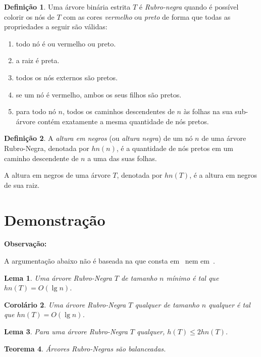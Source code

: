 \documentclass[11pt,twoside]{article}
\newtheorem{theorem}{Teorema}[section]
\newtheorem{lemma}[theorem]{Lema}
\newtheorem{corollary}[theorem]{Corolário}
\theoremstyle{definition}
\newtheorem{definition}{Definição}[section]
\begin{document}
\begin{definition}
	Uma árvore binária estrita \( T \) é \emph{Rubro-negra} quando é possível colorir os nós de \( T \) com as cores \emph{vermelho} ou \emph{preto} de forma que todas as propriedades a seguir são válidas:
	\begin{enumerate}[label=(\alph*)]
		\item todo nó é ou vermelho ou preto.
		\item a raiz é preta.
		\item todos os nós externos são pretos.
		\item se um nó é vermelho, ambos os seus filhos são pretos.
		\item para todo nó \( n \), todos os caminhos descendentes de \( n \) às folhas na sua sub-árvore contém exatamente a mesma quantidade de nós pretos.
	\end{enumerate}
\end{definition}

\begin{definition}
	A \emph{altura em negros} (ou \emph{altura negra}) de um nó \( n \) de uma árvore Rubro-Negra, denotada por \( hn(n) \), é a quantidade de nós pretos em um caminho descendente de \( n \) a uma das suas folhas.

	A altura em negros de uma árvore \( T \), denotada por \( hn(T) \), é a altura em negros de sua raiz.
\end{definition}

\section{Demonstração}

\begin{framed}
	{\bfseries Observação:}

	A argumentação abaixo não é baseada na que consta em~\textcite{Szwarcfiter2010} nem em~\textcite{Cormen2009}.
\end{framed}

\begin{lemma}
	Uma árvore Rubro-Negra \( T \) de tamanho \( n \) \emph{mínimo} é tal que \( hn(T) = O(\lg n) \).
\end{lemma}

\begin{corollary}
	Uma árvore Rubro-Negra \( T \) qualquer de tamanho \( n \) \emph{qualquer} é tal que \( hn(T) = O(\lg n) \).
\end{corollary}

\begin{lemma}
	Para uma árvore Rubro-Negra \( T \) qualquer, \( h(T) \leq 2 hn(T) \).
\end{lemma}

\begin{theorem}
	Árvores Rubro-Negras são balanceadas.
\end{theorem}

\printbibliography
\end{document}
